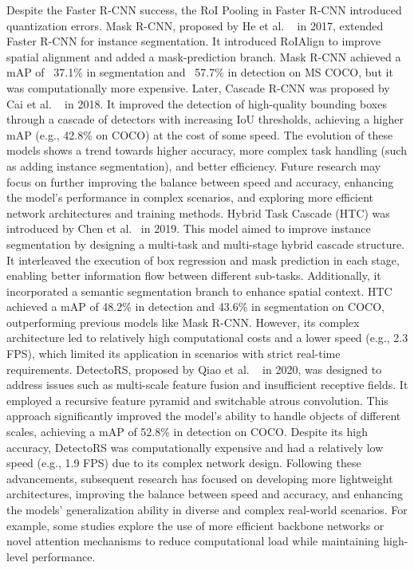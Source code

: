 \documentclass[a4paper,fleqn]{cas-dc}
\begin{document}
Despite the Faster R-CNN success, the RoI Pooling in Faster R-CNN introduced quantization errors. Mask R-CNN, proposed by He et al. ~\cite{he2017mask} in 2017, extended Faster R-CNN for instance segmentation. It introduced RoIAlign to improve spatial alignment and added a mask-prediction branch. Mask R-CNN achieved a mAP of ~37.1\% in segmentation and ~57.7\% in detection on MS COCO, but it was computationally more expensive.
Later, Cascade R-CNN was proposed by Cai et al. ~\cite{cai2018cascade} in 2018. It improved the detection of high-quality bounding boxes through a cascade of detectors with increasing IoU thresholds, achieving a higher mAP (e.g., 42.8\% on COCO) at the cost of some speed. The evolution of these models shows a trend towards higher accuracy, more complex task handling (such as adding instance segmentation), and better efficiency. Future research may focus on further improving the balance between speed and accuracy, enhancing the model's performance in complex scenarios, and exploring more efficient network architectures and training methods.
Hybrid Task Cascade (HTC) was introduced by Chen et al.~\cite{chen2019hybrid} in 2019. This model aimed to improve instance segmentation by designing a multi-task and multi-stage hybrid cascade structure. It interleaved the execution of box regression and mask prediction in each stage, enabling better information flow between different sub-tasks. Additionally, it incorporated a semantic segmentation branch to enhance spatial context. HTC achieved a mAP of 48.2\% in detection and 43.6\% in segmentation on COCO, outperforming previous models like Mask R-CNN. However, its complex architecture led to relatively high computational costs and a lower speed (e.g., 2.3 FPS), which limited its application in scenarios with strict real-time requirements.
DetectoRS, proposed by Qiao et al. ~\cite{qiao2021detectors} in 2020, was designed to address issues such as multi-scale feature fusion and insufficient receptive fields. It employed a recursive feature pyramid and switchable atrous convolution. This approach significantly improved the model's ability to handle objects of different scales, achieving a mAP of 52.8\% in detection on COCO. Despite its high accuracy, DetectoRS was computationally expensive and had a relatively low speed (e.g., 1.9 FPS) due to its complex network design.
Following these advancements, subsequent research has focused on developing more lightweight architectures, improving the balance between speed and accuracy, and enhancing the models' generalization ability in diverse and complex real-world scenarios. For example, some studies explore the use of more efficient backbone networks or novel attention mechanisms to reduce computational load while maintaining high-level performance.
\end{document}
